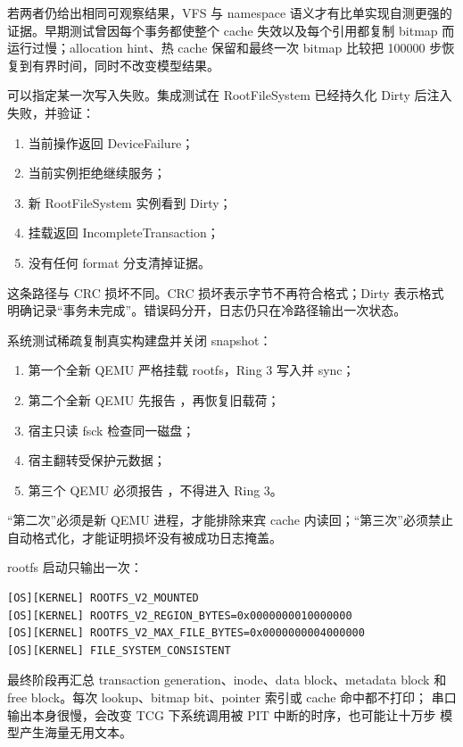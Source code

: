 若两者仍给出相同可观察结果，VFS 与 namespace 语义才有比单实现自测更强的
证据。早期测试曾因每个事务都使整个 cache 失效以及每个引用都复制 bitmap
而运行过慢；allocation hint、热 cache 保留和最终一次 bitmap 比较把
100000 步恢复到有界时间，同时不改变模型结果。

 可以指定某一次写入失败。集成测试在
RootFileSystem 已经持久化 Dirty 后注入失败，并验证：

\begin{enumerate}
  \item 当前操作返回 DeviceFailure；
  \item 当前实例拒绝继续服务；
  \item 新 RootFileSystem 实例看到 Dirty；
  \item 挂载返回 IncompleteTransaction；
  \item 没有任何 format 分支清掉证据。
\end{enumerate}

这条路径与 CRC 损坏不同。CRC 损坏表示字节不再符合格式；Dirty 表示格式
明确记录“事务未完成”。错误码分开，日志仍只在冷路径输出一次状态。

系统测试稀疏复制真实构建盘并关闭 snapshot：

\begin{enumerate}
  \item 第一个全新 QEMU 严格挂载 rootfs，Ring 3 写入并 sync；
  \item 第二个全新 QEMU 先报告 ，再恢复旧载荷；
  \item 宿主只读 fsck 检查同一磁盘；
  \item 宿主翻转受保护元数据；
  \item 第三个 QEMU 必须报告 ，不得进入 Ring 3。
\end{enumerate}

“第二次”必须是新 QEMU 进程，才能排除来宾 cache 内读回；“第三次”必须禁止
自动格式化，才能证明损坏没有被成功日志掩盖。

rootfs 启动只输出一次：

\begin{lstlisting}[caption={v1.6 稳定文件系统里程碑}]
[OS][KERNEL] ROOTFS_V2_MOUNTED
[OS][KERNEL] ROOTFS_V2_REGION_BYTES=0x0000000010000000
[OS][KERNEL] ROOTFS_V2_MAX_FILE_BYTES=0x0000000004000000
[OS][KERNEL] FILE_SYSTEM_CONSISTENT
\end{lstlisting}

最终阶段再汇总 transaction generation、inode、data block、metadata block
和 free block。每次 lookup、bitmap bit、pointer 索引或 cache 命中都不打印；
串口输出本身很慢，会改变 TCG 下系统调用被 PIT 中断的时序，也可能让十万步
模型产生海量无用文本。

